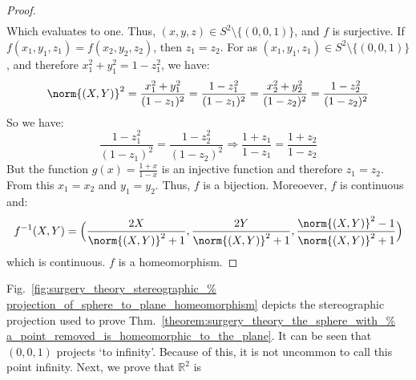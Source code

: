 \documentclass[crop=false,class=book,oneside]{standalone}                      %
\begin{document}
\begin{proof}
\begin{subequations}
\begin{align}
                    \end{align}
                \end{subequations}
                Which evaluates to one. Thus, $(x,y,z)\in S^{2}\setminus\{(0,0,1)\}$,
                and $f$ is surjective. If $f(x_{1},y_{1},z_{1})=f(x_{2},y_{2},z_{2})$,
                then $z_{1}=z_{2}$. For as
                $(x_{1},y_{1},z_{1})\in S^{2}\setminus\{(0,0,1)\}$,
                and therefore $x_{1}^{2}+y_{1}^{2}=1-z_{1}^{2}$, we have:
                \begin{equation}
                    \norm{(X,Y)}^{2}
                    =\frac{x_{1}^2+y_{1}^2}{(1-z_{1})^{2}}
                    =\frac{1-z_{1}^{2}}{(1-z_{1})^{2}}
                    =\frac{x_{2}^{2}+y_{2}^{2}}{(1-z_{2})^{2}}
                    =\frac{1-z_{2}^{2}}{(1-z_{2})^{2}}
                \end{equation}
                So we have:
                \begin{equation}
                    \frac{1-z_{1}^{2}}{(1-z_{1})^{2}}
                    =\frac{1-z_{2}^{2}}{(1-z_{2})^{2}}
                    \Rightarrow
                    \frac{1+z_{1}}{1-z_{1}}
                    =\frac{1+z_{2}}{1-z_{2}}
                \end{equation}
                But the function $g(x)=\frac{1+x}{1-x}$
                is an injective function and therefore $z_{1}=z_{2}$.
                From this $x_{1}=x_{2}$ and $y_{1}=y_{2}$.
                Thus, $f$ is a bijection. Moreoever,
                $f$ is continuous and:
                \begin{equation}
                    f^{-1}(X,Y)
                    =\Big(\frac{2X}{\norm{(X,Y)}^{2}+1},
                      \frac{2Y}{\norm{(X,Y)}^{2}+1},
                      \frac{\norm{(X,Y)}^{2}-1}{\norm{(X,Y)}^{2}+1}\Big)
                \end{equation}
                which is continuous. $f$ is a homeomorphism.
            \end{proof}
            Fig.~\ref{fig:surgery_theory_stereographic_%
                      projection_of_sphere_to_plane_homeomorphism}
            depicts the stereographic projection used
            to prove Thm.~\ref{theorem:surgery_theory_the_sphere_with_%
                               a_point_removed_is_homeomorphic_to_the_plane}.
            It can be seen that $(0,0,1)$ projects `to infinity'.
            Because of this, it is not uncommon to call this point
            infinity. Next, we prove that $\mathbb{R}^{2}$ is
\end{document}
